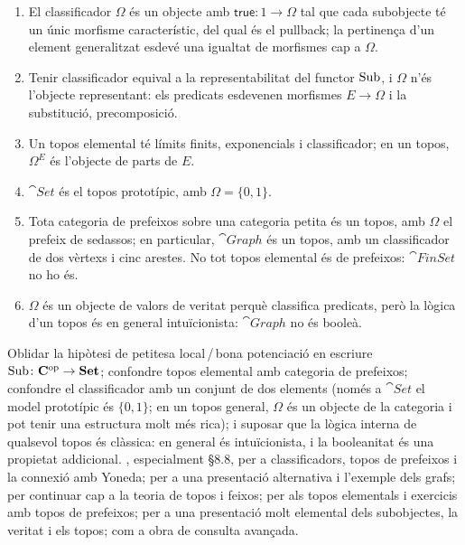 \begin{resumcap}
\begin{enumerate}
  \item El classificador $\Omega$ és un objecte amb $\mathsf{true}\colon 1\to\Omega$ tal que cada subobjecte té un únic morfisme característic, del qual és el pullback; la pertinença d'un element generalitzat esdevé una igualtat de morfismes cap a $\Omega$.
  \item Tenir classificador equival a la representabilitat del functor $\operatorname{Sub}$, i $\Omega$ n'és l'objecte representant: els predicats esdevenen morfismes $E\to\Omega$ i la substitució, precomposició.
  \item Un topos elemental té límits finits, exponencials i classificador; en un topos, $\Omega^{E}$ és l'objecte de parts de $E$.
  \item $\cat{Set}$ és el topos prototípic, amb $\Omega=\{0,1\}$.
  \item Tota categoria de prefeixos sobre una categoria petita és un topos, amb $\Omega$ el prefeix de sedassos; en particular, $\cat{Graph}$ és un topos, amb un classificador de dos vèrtexs i cinc arestes. No tot topos elemental és de prefeixos: $\cat{FinSet}$ no ho és.
  \item $\Omega$ és un objecte de valors de veritat perquè classifica predicats, però la lògica d'un topos és en general intuïcionista: $\cat{Graph}$ no és booleà.
\end{enumerate}
 Oblidar la hipòtesi de petitesa local\,/\,bona potenciació en escriure $\operatorname{Sub}\colon\mathbf{C}^{\mathrm{op}}\to\mathbf{Set}$; confondre topos elemental amb categoria de prefeixos; confondre el classificador amb un conjunt de dos elements (només a $\cat{Set}$ el model prototípic és $\{0,1\}$; en un topos general, $\Omega$ és un objecte de la categoria i pot tenir una estructura molt més rica); i suposar que la lògica interna de qualsevol topos és clàssica: en general és intuïcionista, i la booleanitat és una propietat addicional.
 \cite[cap.~8]{awodey}, especialment §8.8, per a classificadors, topos de prefeixos i la connexió amb Yoneda; \cite[cap.~15]{barrwells} per a una presentació alternativa i l'exemple dels grafs; \cite[cap.~1--2]{maclanemoerdijk} per continuar cap a la teoria de topos i feixos; \cite[§§12 i 14]{streicher} per als topos elementals i exercicis amb topos de prefeixos; \cite[article~VI, sessions~32--33]{lawvereschanuel} per a una presentació molt elemental dels subobjectes, la veritat i els topos; \cite{johnstone} com a obra de consulta avançada.
\end{resumcap}
